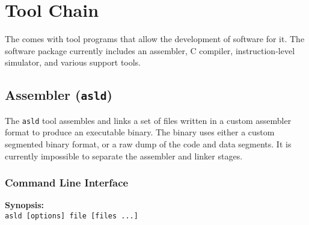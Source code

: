 \chapter{Tool Chain}
\label{tool_chain}

The \eco comes with tool programs that allow the development of software for it. The software package currently includes an assembler, C compiler, instruction-level simulator, and various support tools.

\section{Assembler ({\tt asld})}

The {\tt asld} tool assembles and links a set of files written in a custom assembler format to produce an executable binary. The binary uses either a custom segmented binary format, or a raw dump of the code and data segments. It is currently impossible to separate the assembler and linker stages.

\subsection{Command Line Interface}

{\bf Synopsis:}\\
{\tt asld [options] file [files ...]}

